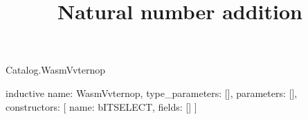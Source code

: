 \begin{lexlean}{Catalog.WasmVvternop}
\title{Natural number addition}
\begin{semanticmodule}
inductive{
  name: WasmVvternop,
  type_parameters: [],
  parameters: [],
  constructors: [
    {name: bITSELECT, fields: []}
  ]
}
\end{semanticmodule}
\end{lexlean}
